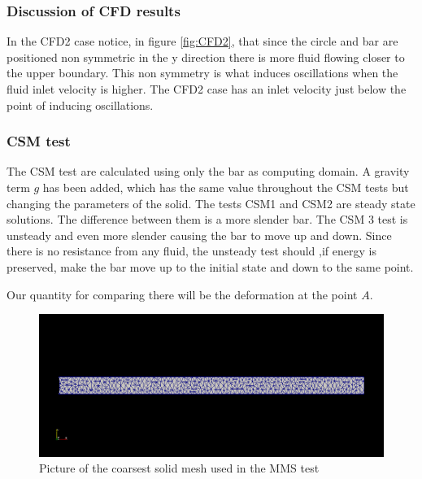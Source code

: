 \subsubsection{Discussion of CFD results}

In the CFD2 case notice, in figure \ref{fig:CFD2}, that since the circle and bar are positioned non symmetric in the y direction there is more fluid flowing closer to the upper boundary. This non symmetry is what induces oscillations when the fluid inlet velocity is higher. The CFD2 case has an inlet velocity just below the point of inducing oscillations.



\subsubsection{CSM test}
The CSM test are calculated using only the bar as computing domain. A gravity term $g$ has been added, which has the same value throughout the CSM tests but changing the parameters of the solid. The tests CSM1 and CSM2 are steady state solutions. The difference between them is a more slender bar. The CSM 3 test is unsteady and even more slender causing the bar to move up and down. Since there is no resistance from any fluid, the unsteady test should ,if energy is preserved, make the bar move up to the initial state and down to the same point.

Our quantity for comparing there will be the deformation at the point $A$. 
\begin{center}
\begin{figure}[H]
\caption{Picture of the coarsest solid mesh used in the MMS test}
\includegraphics[scale=0.50,trim={18mm 55mm 18mm 55mm},clip]{./Verification_Validation/Hron_Turek/structure.png}
\end{figure}
\end{center}

\vspace{0cm}

